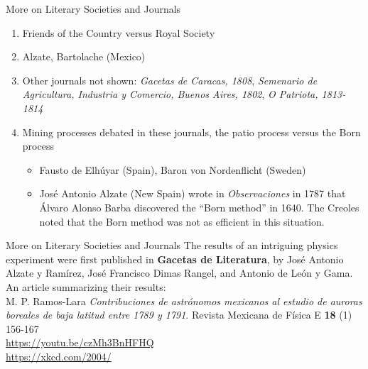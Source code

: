 \documentclass{beamer}
\begin{document}
\begin{frame}{More on Literary Societies and Journals}
\small
\begin{enumerate}
\item Friends of the Country versus Royal Society
\item Alzate, Bartolache (Mexico)
\item Other journals not shown: \textit{Gacetas de Caracas, 1808}, \textit{Semenario de Agricultura, Industria y Comercio, Buenos Aires, 1802}, \textit{O Patriota, 1813-1814}
\item Mining processes debated in these journals, the patio process versus the Born process
\begin{itemize}
\item Fausto de Elh\'{u}yar (Spain), Baron von Nordenflicht (Sweden)
\item Jos\'{e} Antonio Alzate (New Spain) wrote in \textit{Observaciones} in 1787 that \'{A}lvaro Alonso Barba discovered the ``Born method'' in 1640.  The Creoles noted that the Born method was not as efficient in this situation.
\end{itemize}
\end{enumerate}
\end{frame}

\begin{frame}{More on Literary Societies and Journals}
The results of an intriguing physics experiment were first published in \textbf{Gacetas de Literatura}, by Jos\'{e} Antonio Alzate y Ram\'{i}rez, Jos\'{e} Francisco Dimas Rangel, and Antonio de Le\'{o}n y Gama.  An article summarizing their results: \\ \vspace{0.5cm}
M. P. Ramos-Lara \textit{Contribuciones de astrónomos mexicanos al estudio de auroras boreales de baja latitud entre 1789 y 1791}.  Revista Mexicana de F\'{i}sica E \textbf{18} (1) 156-167 \\ \vspace{0.5cm}
\url{https://youtu.be/czMh3BnHFHQ} \\
\url{https://xkcd.com/2004/}
\end{frame}
\end{document}
